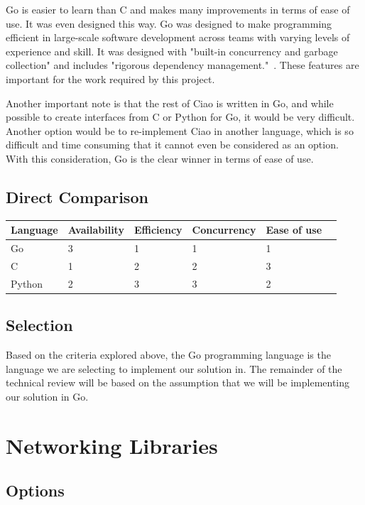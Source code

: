 \documentclass[10pt,letterpaper,onecolumn,draftclsnofoot]{IEEEtran}
\begin{document}
Go is easier to learn than C and makes many improvements in terms of ease of
use. It was even designed this way. Go was designed to make programming
efficient in large-scale software development across teams with varying levels
of experience and skill. It was designed with "built-in concurrency and garbage
collection" and includes "rigorous dependency management."~\cite{godesign}.
These features are important for the work required by this project.

Another important note is that the rest of Ciao is written in Go, and while
possible to create interfaces from C or Python for Go, it would be very
difficult. Another option would be to re-implement Ciao in another language,
which is so difficult and time consuming that it cannot even be considered as an
option. With this consideration, Go is the clear winner in terms of ease of use.

\subsection{Direct Comparison}

\begin{center}
	\begin{tabular}{| l | l | l | l | l | l |}
		\hline
		Language & Availability & Efficiency & Concurrency & Ease of use
		\\ \hline
		Go     & 3 & 1 & 1 & 1 \\ \hline
		C      & 1 & 2 & 2 & 3 \\ \hline
		Python & 2 & 3 & 3 & 2 \\ \hline
	\end{tabular}
\end{center}

\subsection{Selection}

Based on the criteria explored above, the Go programming language is the
language we are selecting to implement our solution in. The remainder of the
technical review will be based on the assumption that we will be implementing
our solution in Go.

\section{Networking Libraries}

\subsection{Options}
\end{document}
